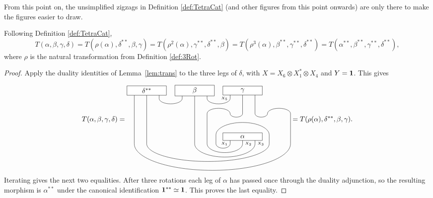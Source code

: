 \documentclass{amsart}
\begin{document}
\begin{remark}
  From this point on, the unsimplified zigzags in Definition \ref{def:TetraCat} (and other figures from this point onwards) are only there to make the figures easier to draw.
\end{remark}

\begin{proposition} \label{prop:rel1}
Following Definition \ref{def:TetraCat}, $$T(\alpha, \beta, \gamma, \delta) = T(\rho(\alpha), \delta^{**}, \beta, \gamma) = T(\rho^{2}(\alpha),\gamma^{**}, \delta^{**}, \beta) = T(\rho^{3}(\alpha),\beta^{**},\gamma^{**}, \delta^{**}) = T(\alpha^{**},\beta^{**},\gamma^{**}, \delta^{**}),$$
where $\rho$ is the natural transformation from Definition \ref{def:3Rot}.
\end{proposition}
\begin{proof}
Apply the duality identities of Lemma~\ref{lem:trans} to the three legs of $\delta$, with $X=X_6\otimes X_1^*\otimes X_4$ and $Y={\bf 1}$. This gives

$$T(\alpha, \beta, \gamma, \delta)=
\raisebox{-2.5cm}{\begin{tikzpicture}[scale=.9]
\draw (-.7+0.6,0)--++(0,-.4) node [left] {\tiny ${X_1}$} arc (0:-180:.4 and .25) --++(0,.5) arc (180:0:1.5 and .7) --++(0,-.5);
\draw (0+0.6,0)--++(0,-.4) node [right] {\tiny ${X_2}$} arc (0:-180:1 and .5) --++(0,1.7) arc (180:0:.65 and .3) arc (-180:0:.35 and .2) --++(0,1.3);
\draw (.7+0.6,0)--++(0,-.4) node [right] {\tiny ${X_3}$} arc (0:-180:1.7 and .75) --++(0,3);

\draw (-2.1-.7,2.6)--++(0,-.45);
\draw (-2.1+.7,2.6)--++(0,-.45) arc (-180:0:.65 and .3);

\draw (0.6-.7,2.6)--++(0,-.45)  node [left] {\tiny ${X_5}$};
\draw (0.6+.7,2.6)--++(0,-1.3) arc (-180:0:.35 and .2) arc (180:0:.65 and .3) --++(0,-1.7);

\draw (-4.8-.7,2.6)--++(0,-3) arc (-180:0:4.4 and 1.5);
\draw (-4.8+.7,2.6)--++ (0,-.45) arc (-180:0:.65 and .3);

\draw (0.6,0) node [draw,fill=white,minimum width=2cm] {$\alpha$};
\draw (-2.1,2.6) node [draw,fill=white,minimum width=2cm] {$\beta$};
\draw (0.6,2.6) node [draw,fill=white,minimum width=2cm] {$\gamma$};
\draw (-4.8,2.6) --++(0,-3) arc (-180:0:3.45 and 1);
\node[draw,fill=white,minimum width=2cm] at (-4.8,2.6) {$\delta^{**}$};
\end{tikzpicture}}
= T(\rho(\alpha), \delta^{**}, \beta, \gamma).
$$
Iterating gives the next two equalities. After three rotations each leg of
$\alpha$ has passed once through the duality adjunction, so the resulting
morphism is $\alpha^{**}$ under the canonical identification
$\one^{**}\simeq\one$. This proves the last equality.
\end{proof}
\end{document}
